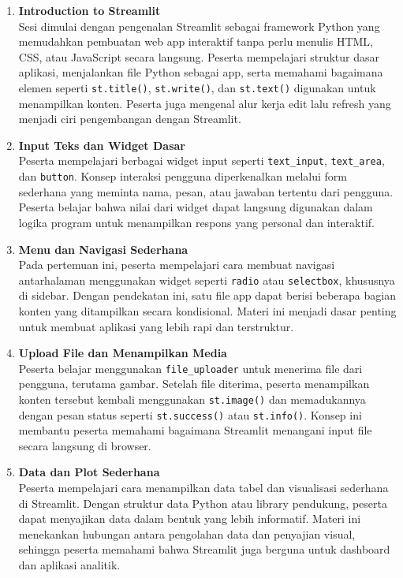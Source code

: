 \documentclass[11pt,a4paper]{article}
\begin{document}
\begin{enumerate}[leftmargin=1.6em, label=\arabic*.]
\item \textbf{Introduction to Streamlit}\\
Sesi dimulai dengan pengenalan Streamlit sebagai framework Python yang memudahkan pembuatan web app interaktif tanpa perlu menulis HTML, CSS, atau JavaScript secara langsung. Peserta mempelajari struktur dasar aplikasi, menjalankan file Python sebagai app, serta memahami bagaimana elemen seperti \texttt{st.title()}, \texttt{st.write()}, dan \texttt{st.text()} digunakan untuk menampilkan konten. Peserta juga mengenal alur kerja edit lalu refresh yang menjadi ciri pengembangan dengan Streamlit.

\item \textbf{Input Teks dan Widget Dasar}\\
Peserta mempelajari berbagai widget input seperti \texttt{text\_input}, \texttt{text\_area}, dan \texttt{button}. Konsep interaksi pengguna diperkenalkan melalui form sederhana yang meminta nama, pesan, atau jawaban tertentu dari pengguna. Peserta belajar bahwa nilai dari widget dapat langsung digunakan dalam logika program untuk menampilkan respons yang personal dan interaktif.

\item \textbf{Menu dan Navigasi Sederhana}\\
Pada pertemuan ini, peserta mempelajari cara membuat navigasi antarhalaman menggunakan widget seperti \texttt{radio} atau \texttt{selectbox}, khususnya di sidebar. Dengan pendekatan ini, satu file app dapat berisi beberapa bagian konten yang ditampilkan secara kondisional. Materi ini menjadi dasar penting untuk membuat aplikasi yang lebih rapi dan terstruktur.

\item \textbf{Upload File dan Menampilkan Media}\\
Peserta belajar menggunakan \texttt{file\_uploader} untuk menerima file dari pengguna, terutama gambar. Setelah file diterima, peserta menampilkan konten tersebut kembali menggunakan \texttt{st.image()} dan memadukannya dengan pesan status seperti \texttt{st.success()} atau \texttt{st.info()}. Konsep ini membantu peserta memahami bagaimana Streamlit menangani input file secara langsung di browser.

\item \textbf{Data dan Plot Sederhana}\\
Peserta mempelajari cara menampilkan data tabel dan visualisasi sederhana di Streamlit. Dengan struktur data Python atau library pendukung, peserta dapat menyajikan data dalam bentuk yang lebih informatif. Materi ini menekankan hubungan antara pengolahan data dan penyajian visual, sehingga peserta memahami bahwa Streamlit juga berguna untuk dashboard dan aplikasi analitik.


\end{enumerate}
\end{document}
